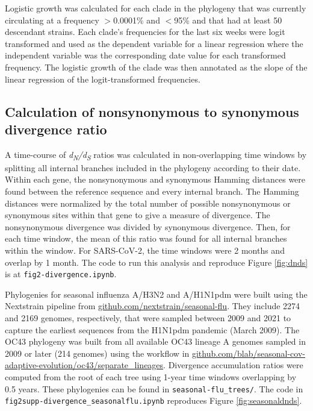 \documentclass[11pt,oneside,letterpaper]{article}
\begin{document}
Logistic growth was calculated for each clade in the phylogeny that was currently circulating at a frequency $>$0.0001\% and $<$95\% and that had at least 50 descendant strains.
Each clade's frequencies for the last six weeks were logit transformed and used as the dependent variable for a linear regression where the independent variable was the corresponding date value for each transformed frequency.
The logistic growth of the clade was then annotated as the slope of the linear regression of the logit-transformed frequencies.

\subsection*{Calculation of nonsynonymous to synonymous divergence ratio}
A time-course of \emph{d\textsubscript{N}/d\textsubscript{S}} ratios was calculated in non-overlapping time windows by splitting all internal branches included in the phylogeny according to their date.
Within each gene, the nonsynonymous and synonymous Hamming distances were found between the reference sequence and every internal branch.
The Hamming distances were normalized by the total number of possible nonsynonymous or synonymous sites within that gene to give a measure of divergence.
The nonsynonymous divergence was divided by synonymous divergence. 
Then, for each time window, the mean of this ratio was found for all internal branches within the window.
For SARS-CoV-2, the time windows were 2 months and overlap by 1 month. 
The code to run this analysis and reproduce Figure \ref{fig:dnds} is at \texttt{fig2-divergence.ipynb}.

Phylogenies for seasonal influenza A/H3N2 and A/H1N1pdm were built using the Nextstrain pipeline from \href{https://github.com/nextstrain/seasonal-flu}{github.com/nextstrain/seasonal-flu}. 
They include 2274 and 2169 genomes, respectively, that were sampled between 2009 and 2021 to capture the earliest sequences from the H1N1pdm pandemic (March 2009).
The OC43 phylogeny was built from all available OC43 lineage A genomes sampled in 2009 or later (214 genomes) using the workflow in \href{https://github.com/blab/seasonal-cov-adaptive-evolution/oc43/separate_lineages}{github.com/blab/seasonal-cov-adaptive-evolution/oc43/separate\_lineages}.
Divergence accumulation ratios were computed from the root of each tree using 1-year time windows overlapping by 0.5 years. 
These phylogenies can be found in \texttt{seasonal-flu\_trees/}.
The code in \texttt{fig2supp-divergence\_seasonalflu.ipynb} reproduces Figure \ref{fig:seasonaldnds}.
\end{document}
